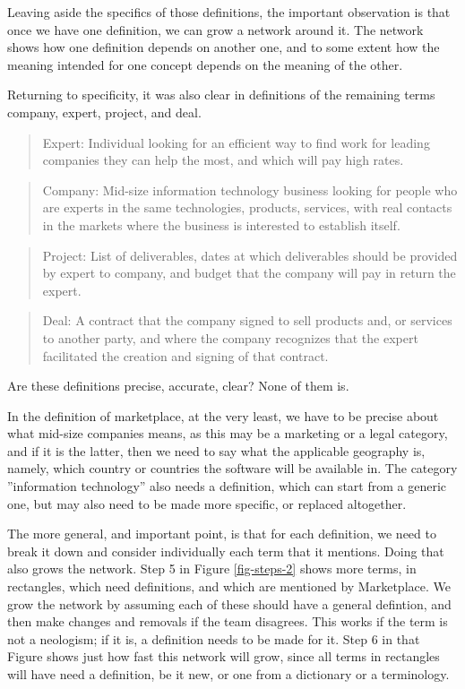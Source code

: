 \documentclass[graybox,envcountchap,sectrefs]{svmono}
\newcommand{\newterm}[1]{\begin{quote}\textsf{#1}\end{quote}}
\newcommand{\nterm}[1]{\textsf{#1}}
\begin{document}
Leaving aside the specifics of those definitions, the important observation is that once we have one definition, we can grow a network around it. The network shows how one definition depends on another one, and to some extent how the meaning intended for one concept depends on the meaning of the other.

Returning to specificity, it was also clear in definitions of the remaining terms \nterm{company}, \nterm{expert}, \nterm{project}, and \nterm{deal}. 

\newterm{Expert: Individual looking for an efficient way to find work for leading companies they can help the most, and which will pay high rates.}

\newterm{Company: Mid-size information technology business looking for people who are experts in the same technologies, products, services, with real contacts in the markets where the business is interested to establish itself.}

\newterm{Project: List of deliverables, dates at which deliverables should be provided by expert to company, and budget that the company will pay in return the expert.}

\newterm{Deal: A contract that the company signed to sell products and, or services to another party, and where the company recognizes that the expert facilitated the creation and signing of that contract.}

Are these definitions precise, accurate, clear? None of them is. 

In the definition of \nterm{marketplace}, at the very least, we have to be precise about what mid-size companies means, as this may be a marketing or a legal category, and if it is the latter, then we need to say what the applicable geography is, namely, which country or countries the software will be available in. The category ''information technology'' also needs a definition, which can start from a generic one, but may also need to be made more specific, or replaced altogether. 

The more general, and important point, is that for each definition, we need to break it down and consider individually each term that it mentions. Doing that also grows the network. Step 5 in Figure \ref{fig-steps-2} shows more terms, in rectangles, which need definitions, and which are mentioned by \nterm{Marketplace}. We grow the network by assuming each of these should have a general defintion, and then make changes and removals if the team disagrees. This works if the term is not a neologism; if it is, a definition needs to be made for it. Step 6 in that Figure shows just how fast this network will grow, since all terms in rectangles will have need a definition, be it new, or one from a dictionary or a terminology.
\end{document}
